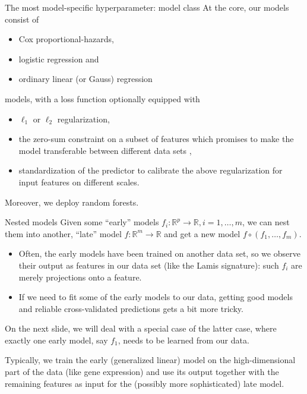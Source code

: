 \documentclass[10pt, aspectratio=169]{beamer}
\def\RR{\mathbb{R}}
\begin{document}
\begin{frame}{The most model-specific hyperparameter: model class}
  At the core, our models consist of 
  \begin{itemize}
    \item Cox proportional-hazards,
    \item logistic regression and 
    \item ordinary linear (or Gauss) regression
  \end{itemize}
  models, \pause with a loss function optionally equipped with
  \begin{itemize}
    \item $\ell_1$ or $\ell_2$ regularization,
    \item the zero-sum constraint on a subset of features which promises to 
      make the model transferable between different data sets 
      \cite{transplatform17},
    \item standardization of the predictor to calibrate the above regularization 
      for input features on different scales.
  \end{itemize}

  \pause
  Moreover, we deploy random forests.
\end{frame}

\begin{frame}{Nested models}
  Given some ``early'' models $f_i: \RR^p \to \RR, i = 1, \ldots, m$, we can nest 
  them into another, ``late'' model $f: \RR^m \to \RR$ and get a new model 
  $f \circ (f_1, \ldots, f_m)$.

  \pause
  \begin{itemize}
    \item Often, the early models have been trained on another data set, so we 
      observe their output as features in our data set (like the Lamis 
      signature): such $f_i$ are merely projections onto a feature.
    \item If we need to fit some of the early models to our data, getting good 
      models and reliable cross-validated predictions gets a bit more tricky. 
  \end{itemize}
  \pause
  On the next slide, we will deal with a special case of the latter case, where 
  exactly one early model, say $f_1$, needs to be learned from our data.

  Typically, we train the early (generalized linear) model on the high-dimensional 
  part of the data (like gene expression) and use its output together with the 
  remaining features as input for the (possibly more sophisticated) late model.
\end{frame}
\end{document}
